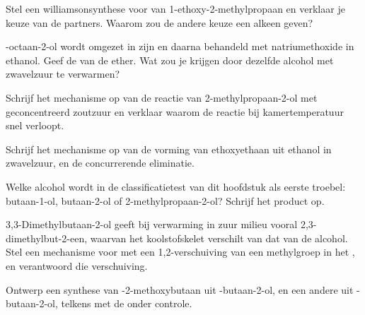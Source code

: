 \begin{exercise}[$\star\star$]\label{exo:b1:alcohol-activation:5}
Stel een williamsonsynthese voor van 1-ethoxy-2-methylpropaan en verklaar
je keuze van de partners. Waarom zou de andere keuze een alkeen geven?
\end{exercise}

\begin{exercise}[$\star\star$]\label{exo:b1:alcohol-activation:6}
-octaan-2-ol wordt omgezet in zijn  en daarna behandeld met
natriumethoxide in ethanol. Geef de  van de ether. Wat zou je
krijgen door dezelfde alcohol met zwavelzuur te verwarmen?
\end{exercise}

\begin{exercise}[$\star\star$]\label{exo:b1:alcohol-activation:7}
Schrijf het mechanisme op van de reactie van 2-methylpropaan-2-ol met
geconcentreerd zoutzuur en verklaar waarom de reactie bij
kamertemperatuur snel verloopt.
\end{exercise}

\begin{exercise}[$\star\star$]\label{exo:b1:alcohol-activation:8}
Schrijf het mechanisme op van de vorming van ethoxyethaan uit ethanol in
zwavelzuur, en de concurrerende eliminatie.
\end{exercise}

\begin{exercise}[$\star\star$]\label{exo:b1:alcohol-activation:9}
Welke alcohol wordt in de classificatietest van dit hoofdstuk als eerste
troebel: butaan-1-ol, butaan-2-ol of 2-methylpropaan-2-ol? Schrijf het
product op.
\end{exercise}

\begin{exercise}[$\star\star\star$]\label{exo:b1:alcohol-activation:10}
3,3-Dimethylbutaan-2-ol geeft bij verwarming in zuur milieu vooral
2,3-dimethylbut-2-een, waarvan het koolstofskelet verschilt van dat van de
alcohol. Stel een mechanisme voor met een 1,2-verschuiving van een
methylgroep in het , en verantwoord die verschuiving.
\end{exercise}

\begin{exercise}[$\star\star\star$]\label{exo:b1:alcohol-activation:11}
Ontwerp een synthese van -2-methoxybutaan uit -butaan-2-ol,
en een andere uit -butaan-2-ol, telkens met de  onder
controle.
\end{exercise}

